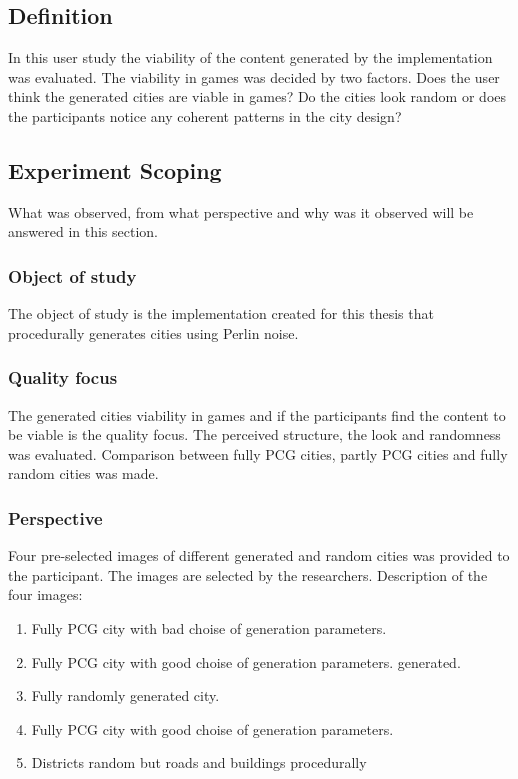 	\subsection{Definition}
	In this user study the viability of the content generated by the implementation was evaluated.  The viability in games was decided by two factors. Does the user think the generated cities are viable in games? Do the cities look random or does the participants notice any coherent patterns in the city design?
			
		
	\subsection{Experiment Scoping}
	What was observed, from what perspective and why was it observed will be answered in this section.
		
	\subsubsection{Object of study}
	The object of study is the implementation created for this thesis that procedurally generates cities using Perlin noise.
			
	\subsubsection{Quality focus}
	The generated cities viability in games and if the participants find the content to be viable is the quality focus. The perceived structure, the look and randomness was evaluated. Comparison between fully PCG cities, partly PCG cities and fully random cities was made.
			
	\subsubsection{Perspective}
	Four pre-selected images of different generated and random cities was provided to the participant. The images are selected by the researchers. Description of the four images:
	
	\begin{enumerate}
		\item Fully PCG city with bad choise of generation parameters.
		\item Fully PCG city with good choise of generation parameters.
		 generated.
		 \item Fully randomly generated city.
		\item Fully PCG city with good choise of generation parameters.
		\item Districts random but roads and buildings procedurally
	\end{enumerate}
			
